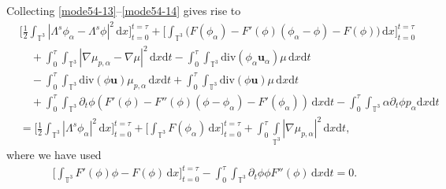 \documentclass[reqno,a4paper,11pt]{amsart}
\theoremstyle{plain}
\numberwithin{equation}{section}
\renewcommand{\d}{\mathrm{d}}
\newcommand{\dx}{\d x}
\newcommand{\dxdt}{\,\d x \d t}
\newcommand{\dt}{\d t}
\begin{document}
				Collecting  \eqref{mode54-13}--\eqref{mode54-14} gives rise to
				\begin{align}
					\label{mode54-15}
					& \nonumber \bigg[\frac{1}{2}\int_{\mathbb{T}^{3}} |\Lambda^{s}\phi_{\alpha} - \Lambda^{s}\phi|^{2}\,\mathrm dx\bigg]_{t=0}^{t=\tau}+
					\bigg[\int_{\mathbb{T}^{3}}\big(F(\phi_{\alpha})- F'(\phi)(\phi_{\alpha}-\phi)-F(\phi)\big)\,\dx\bigg]_{t=0}^{t=\tau}
					\\&\quad\nonumber+\int_0^{\tau}\int_{\mathbb{T}^{3}}|\nabla \mu_{p,\alpha}-\nabla \mu|^{2}\dxdt-\int_0^\tau\int_{\mathbb{T}^{3}}\mathrm{div}(\phi_{\alpha}\mathbf{u}_{\alpha})\mu\,\dx\dt
					\\&\quad\nonumber  -\int_0^\tau\int_{\mathbb{T}^{3}}\mathrm{div}(\phi\mathbf{u})\mu_{p,\alpha}\,\dx\dt+\int_0^\tau\int_{\mathbb{T}^{3}}\mathrm{div}(\phi\mathbf{u}) \mu\,\dx\dt
					\\&\quad+\int_0^\tau\int_{\mathbb{T}^{3}}\partial_{t}\phi (F'(\phi)-F''(\phi)(\phi-\phi_{\alpha})-F'(\phi_{\alpha}))\,\dx\dt
					-\int_0^\tau\int_{\mathbb{T}^{3}} \alpha\partial _{t}\phi p_{\alpha}\dx\dt\nonumber
					\\&=\bigg[\frac{1}{2}\int_{\mathbb{T}^{3}} |\Lambda^{s}\phi_{\alpha}|^{2}\,\dx\bigg]_{t=0}^{t=\tau}+\bigg[\int_{\mathbb{T}^{3}}F(\phi_{\alpha})\,\dx\bigg]_{t=0}^{t=\tau}+\int_0^{\tau}\int\limits_{\mathbb{T}^{3}}|\nabla \mu_{p,\alpha}|^{2}\dxdt,
				\end{align}
				where we have used
				\begin{align*}
					\bigg[\int_{\mathbb{T}^{3}}F'(\phi)\phi-F(\phi)\,\dx\bigg]_{t=0}^{t=\tau}-\int_0^\tau\int_{\mathbb{T}^{3}} \partial_{t}\phi\phi F''(\phi)\,\dx\dt = 0.
				\end{align*}
				
\end{document}

